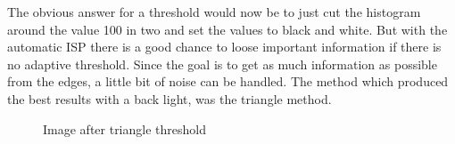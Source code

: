 The obvious answer for a threshold would now be to just cut the histogram around the value 100 in two and set the values to black and white. But with the automatic ISP there is a good chance to loose important information if there is no adaptive threshold. Since the goal is to get as much information as possible from the edges, a little bit of noise can be handled. The method which produced the best results with a back light, was the triangle method. 
\begin{figure}
	\centering
	\caption{Image after triangle threshold}
	\label{development:thresh}
\end{figure}
